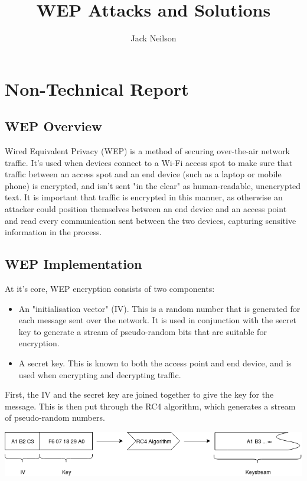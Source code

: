 \documentclass[11pt]{article}
\begin{document}
\title{WEP Attacks and Solutions}
\author{Jack Neilson}
\maketitle

\tableofcontents
\newpage

\section{Non-Technical Report}
\subsection{WEP Overview}
Wired Equivalent Privacy (WEP) is a method of securing over-the-air network traffic. It's used when devices connect to a Wi-Fi access spot to make sure that traffic between an access spot and an end device (such as a laptop or mobile phone) is encrypted, and isn't sent "in the clear" as human-readable, unencrypted text. It is important that traffic is encrypted in this manner, as otherwise an attacker could position themselves between an end device and an access point and read every communication sent between the two devices, capturing sensitive information in the process.

\subsection{WEP Implementation}
At it's core, WEP encryption consists of two components:

\begin{itemize}
\item{An "initialisation vector" (IV). This is a random number that is generated for each message sent over the network. It is used in conjunction with the secret key to generate a stream of pseudo-random bits that are suitable for encryption.} 

\item{A secret key. This is known to both the access point and end device, and is used when encrypting and decrypting traffic.}
\end{itemize}

First, the IV and the secret key are joined together to give the key for the message. This is then put through the RC4 algorithm, which generates a stream of pseudo-random numbers.

\vspace{10px}
\centerline{\includegraphics[width=\linewidth]{res/keystream.png}}
\vspace{6px}
\end{document}
